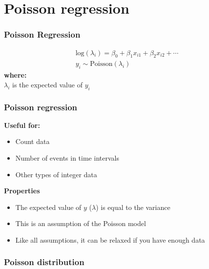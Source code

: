 \documentclass[color=usenames,dvipsnames]{beamer}\usepackage[]{graphicx}\usepackage[]{color}
\begin{document}
\section{Poisson regression}



\begin{frame}
  \frametitle{Poisson Regression}
  \Large
    \begin{gather*}
      \mathrm{log}(\lambda_i) = \beta_0 + \beta_1 x_{i1} + \beta_2 x_{i2} + \cdots \\
      y_i \sim \mathrm{Poisson}(\lambda_i)
  \end{gather*}
  \pause
  {\bf where: \\}
  $\lambda_i$ is the expected value of $y_i$ \\
\end{frame}



\begin{frame}
  \frametitle{Poisson regression}
  \large
  {\bf Useful for:}
  \begin{itemize}
    \item Count data
    \item Number of events in time intervals
    \item Other types of integer data
  \end{itemize}
  \pause
  \vfill
  {\bf Properties}
  \begin{itemize}
    \item The expected value of $y$ ($\lambda$) is equal to the variance
    \item This is an assumption of the Poisson model
    \item Like all assumptions, it can be relaxed if you have enough data
  \end{itemize}
\end{frame}




\begin{frame}[fragile]
  \frametitle{Poisson distribution}



\begin{center}
\end{center}
\end{frame}
\end{document}
